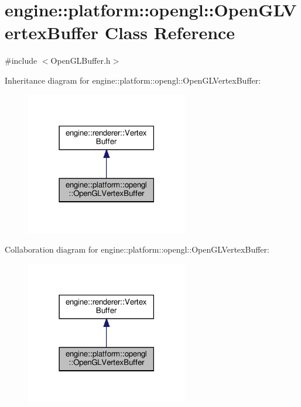 \hypertarget{classengine_1_1platform_1_1opengl_1_1OpenGLVertexBuffer}{}\section{engine\+:\+:platform\+:\+:opengl\+:\+:Open\+G\+L\+Vertex\+Buffer Class Reference}
\label{classengine_1_1platform_1_1opengl_1_1OpenGLVertexBuffer}


{\ttfamily \#include $<$Open\+G\+L\+Buffer.\+h$>$}



Inheritance diagram for engine\+:\+:platform\+:\+:opengl\+:\+:Open\+G\+L\+Vertex\+Buffer\+:\nopagebreak
\begin{figure}[H]
\begin{center}
\leavevmode
\includegraphics[width=201pt]{classengine_1_1platform_1_1opengl_1_1OpenGLVertexBuffer__inherit__graph}
\end{center}
\end{figure}


Collaboration diagram for engine\+:\+:platform\+:\+:opengl\+:\+:Open\+G\+L\+Vertex\+Buffer\+:\nopagebreak
\begin{figure}[H]
\begin{center}
\leavevmode
\includegraphics[width=201pt]{classengine_1_1platform_1_1opengl_1_1OpenGLVertexBuffer__coll__graph}
\end{center}
\end{figure}
